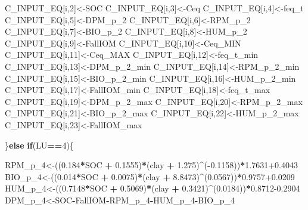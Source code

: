 \documentclass[
  10pt,
  b5paper,
]{book}
\newenvironment{Shaded}{\begin{snugshade}}{\end{snugshade}}
\newcommand{\ControlFlowTok}[1]{\textcolor[rgb]{0.13,0.29,0.53}{\textbf{#1}}}
\newcommand{\DecValTok}[1]{\textcolor[rgb]{0.00,0.00,0.81}{#1}}
\newcommand{\FloatTok}[1]{\textcolor[rgb]{0.00,0.00,0.81}{#1}}
\newcommand{\NormalTok}[1]{#1}
\newcommand{\OperatorTok}[1]{\textcolor[rgb]{0.81,0.36,0.00}{\textbf{#1}}}
\newcommand{\StringTok}[1]{\textcolor[rgb]{0.31,0.60,0.02}{#1}}
\begin{document}
\begin{Shaded}
\begin{Highlighting}[]
{\NormalTok{C_INPUT_EQ[i,}\DecValTok{2}\NormalTok{]<-SOC}
\NormalTok{C_INPUT_EQ[i,}\DecValTok{3}\NormalTok{]<-Ceq}
\NormalTok{C_INPUT_EQ[i,}\DecValTok{4}\NormalTok{]<-feq_t}
\NormalTok{C_INPUT_EQ[i,}\DecValTok{5}\NormalTok{]<-DPM_p_}\DecValTok{2}
\NormalTok{C_INPUT_EQ[i,}\DecValTok{6}\NormalTok{]<-RPM_p_}\DecValTok{2}
\NormalTok{C_INPUT_EQ[i,}\DecValTok{7}\NormalTok{]<-BIO_p_}\DecValTok{2}
\NormalTok{C_INPUT_EQ[i,}\DecValTok{8}\NormalTok{]<-HUM_p_}\DecValTok{2}
\NormalTok{C_INPUT_EQ[i,}\DecValTok{9}\NormalTok{]<-FallIOM}
\NormalTok{C_INPUT_EQ[i,}\DecValTok{10}\NormalTok{]<-Ceq_MIN}
\NormalTok{C_INPUT_EQ[i,}\DecValTok{11}\NormalTok{]<-Ceq_MAX}
\NormalTok{C_INPUT_EQ[i,}\DecValTok{12}\NormalTok{]<-feq_t_min}
\NormalTok{C_INPUT_EQ[i,}\DecValTok{13}\NormalTok{]<-DPM_p_}\DecValTok{2}\NormalTok{_min}
\NormalTok{C_INPUT_EQ[i,}\DecValTok{14}\NormalTok{]<-RPM_p_}\DecValTok{2}\NormalTok{_min}
\NormalTok{C_INPUT_EQ[i,}\DecValTok{15}\NormalTok{]<-BIO_p_}\DecValTok{2}\NormalTok{_min}
\NormalTok{C_INPUT_EQ[i,}\DecValTok{16}\NormalTok{]<-HUM_p_}\DecValTok{2}\NormalTok{_min}
\NormalTok{C_INPUT_EQ[i,}\DecValTok{17}\NormalTok{]<-FallIOM_min}
\NormalTok{C_INPUT_EQ[i,}\DecValTok{18}\NormalTok{]<-feq_t_max}
\NormalTok{C_INPUT_EQ[i,}\DecValTok{19}\NormalTok{]<-DPM_p_}\DecValTok{2}\NormalTok{_max}
\NormalTok{C_INPUT_EQ[i,}\DecValTok{20}\NormalTok{]<-RPM_p_}\DecValTok{2}\NormalTok{_max}
\NormalTok{C_INPUT_EQ[i,}\DecValTok{21}\NormalTok{]<-BIO_p_}\DecValTok{2}\NormalTok{_max}
\NormalTok{C_INPUT_EQ[i,}\DecValTok{22}\NormalTok{]<-HUM_p_}\DecValTok{2}\NormalTok{_max}
\NormalTok{C_INPUT_EQ[i,}\DecValTok{23}\NormalTok{]<-FallIOM_max}

\NormalTok{\}}\ControlFlowTok{else} \ControlFlowTok{if}\NormalTok{(LU}\OperatorTok{==}\DecValTok{4}\NormalTok{)\{}

\NormalTok{RPM_p_}\DecValTok{4}\NormalTok{<-((}\FloatTok{0.184}\OperatorTok{*}\NormalTok{SOC }\OperatorTok{+}\StringTok{ }\FloatTok{0.1555}\NormalTok{)}\OperatorTok{*}\NormalTok{(clay }\OperatorTok{+}\StringTok{ }\FloatTok{1.275}\NormalTok{)}\OperatorTok{^}\NormalTok{(}\OperatorTok{-}\FloatTok{0.1158}\NormalTok{))}\OperatorTok{*}\FloatTok{1.7631+0.4043}
\NormalTok{BIO_p_}\DecValTok{4}\NormalTok{<-((}\FloatTok{0.014}\OperatorTok{*}\NormalTok{SOC }\OperatorTok{+}\StringTok{ }\FloatTok{0.0075}\NormalTok{)}\OperatorTok{*}\NormalTok{(clay }\OperatorTok{+}\StringTok{ }\FloatTok{8.8473}\NormalTok{)}\OperatorTok{^}\NormalTok{(}\FloatTok{0.0567}\NormalTok{))}\OperatorTok{*}\FloatTok{0.9757+0.0209}
\NormalTok{HUM_p_}\DecValTok{4}\NormalTok{<-((}\FloatTok{0.7148}\OperatorTok{*}\NormalTok{SOC }\OperatorTok{+}\StringTok{ }\FloatTok{0.5069}\NormalTok{)}\OperatorTok{*}\NormalTok{(clay }\OperatorTok{+}\StringTok{ }\FloatTok{0.3421}\NormalTok{)}\OperatorTok{^}\NormalTok{(}\FloatTok{0.0184}\NormalTok{))}\OperatorTok{*}\FloatTok{0.8712-0.2904}
\NormalTok{DPM_p_}\DecValTok{4}\NormalTok{<-SOC}\OperatorTok{-}\NormalTok{FallIOM}\OperatorTok{-}\NormalTok{RPM_p_}\DecValTok{4}\OperatorTok{-}\NormalTok{HUM_p_}\DecValTok{4}\OperatorTok{-}\NormalTok{BIO_p_}\DecValTok{4}

}
\end{Highlighting}
\end{Shaded}
\end{document}
